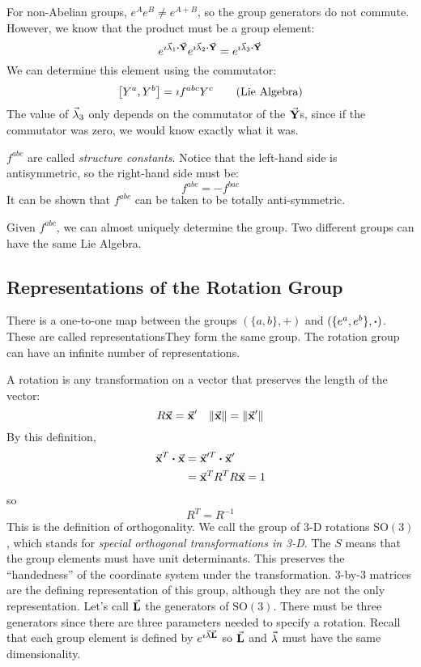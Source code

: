 \documentclass[a4paper,twoside,master.tex]{subfiles}
\begin{document}
For non-Abelian groups, $ e^{A} e^{B} \neq e^{A+B} $, so the group generators do not commute. However, we know that the product must be a group element:
\begin{equation}
    e^{\imath \va{\lambda}_1 \vdot\va{ Y}} e^{\imath \va{\lambda}_2 \vdot\va{ Y}} = e^{\imath \va{\lambda}_3 \vdot\va{ Y}}
\end{equation}
We can determine this element using the commutator:
\begin{equation}\label{eq:lie_algebra}
    \comm{Y^a}{Y^b} = \imath f^{abc} Y^c\tag{Lie Algebra}
\end{equation}
The value of $\va{\lambda}_3$ only depends on the commutator of the $\va{ Y} $s, since if the commutator was zero, we would know exactly what it was.

$ f^{abc} $ are called \textit{structure constants}. Notice that the left-hand side is antisymmetric, so the right-hand side must be:
\begin{equation}
    f^{abc} = - f^{bac}
\end{equation}
It can be shown that $ f^{abc} $ can be taken to be totally anti-symmetric.

Given $ f^{abc} $, we can almost uniquely determine the group. Two different groups can have the same Lie Algebra.

\subsection{Representations of the Rotation Group}
\label{sub:representations_of_the_rotation_group}

There is a one-to-one map between the groups $ (\{a,b\}, +) $ and $ (\{e^{a}, e^{b}\}, \vdot) $. These are called representations\textemdash They form the same group. The rotation group can have an infinite number of representations.

A rotation is any transformation on a vector that preserves the length of the vector:
\begin{equation}
    R\va{ x} =\va{ x}' \quad \norm{\va{x}} = \norm{\va{x}'}
\end{equation}
By this definition,
\begin{align}
    \va{ x}^T \vdot\va{ x} &= \va{ x}'^T \vdot\va{ x}' \\
    &=\va{ x}^T R^T R\va{ x} = 1
\end{align}
so
\begin{equation}
    R^T = R^{-1}
\end{equation}
This is the definition of orthogonality. We call the group of 3-D rotations $ \text{SO}(3) $, which stands for \textit{special orthogonal transformations in 3-D}. The $ S $ means that the group elements must have unit determinants. This preserves the ``handedness'' of the coordinate system under the transformation. $ 3 $-by-$ 3 $ matrices are the defining representation of this group, although they are not the only representation. Let's call $\va{ L} $ the generators of $ \text{SO}(3) $. There must be three generators since there are three parameters needed to specify a rotation. Recall that each group element is defined by $ e^{\imath \va{\lambda}\va{ L}} $ so $\va{ L} $ and $ \va{\lambda} $ must have the same dimensionality.
\end{document}

